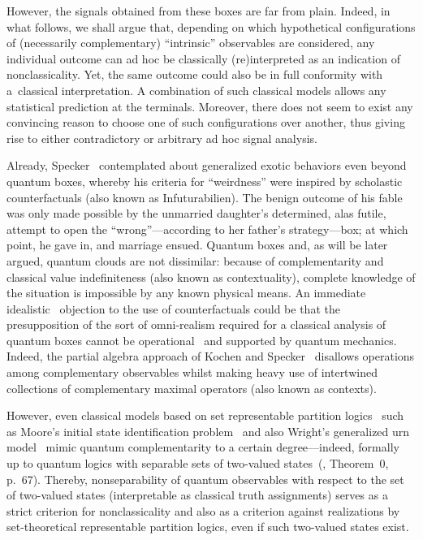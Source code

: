 However, the signals obtained from these boxes are far from plain.
Indeed, in what follows, we shall argue that,
depending on which hypothetical configurations of (necessarily complementary) ``intrinsic'' observables are
considered, any individual outcome can {ad hoc} be classically (re)interpreted as an indication of nonclassicality.
Yet, the same outcome could also be in full conformity with a~classical interpretation.
A combination of such classical models allows any statistical prediction at the terminals.
Moreover,
there does not seem to exist any convincing reason to choose one
of such configurations over another, thus giving rise to either contradictory or arbitrary {ad hoc} signal analysis.

Already, Specker~\cite{Specker-60} contemplated about generalized exotic behaviors even beyond quantum boxes,
whereby his criteria for ``weirdness'' were inspired by scholastic counterfactuals
(also known as {Infuturabilien}).
The benign outcome of his fable was only made possible by the unmarried daughter's determined, alas futile, attempt to open
the ``wrong''---according to her father's strategy---box; at which point, he gave in, and marriage ensued.
Quantum boxes and, as will be later argued, quantum clouds are not dissimilar: because
of complementarity
and classical value indefiniteness (also known as contextuality),
complete knowledge of the situation is impossible by any known physical means.
An immediate idealistic~\cite{berkeley,stace,Goldschmidt2017-idealism}
objection to the use of counterfactuals could
be that the presupposition of the sort of omni-realism required for a classical analysis of quantum boxes
cannot be operational~\cite{bridgman} and supported by quantum mechanics.
Indeed, the partial algebra approach of Kochen and Specker~\cite{Kochen2,Kochen3,Kochen1}
disallows operations among complementary observables
whilst making heavy use of intertwined collections of complementary maximal operators (also known as contexts).


However, even classical models based on set representable partition logics~\cite{svozil-2001-eua}
such as Moore's initial state identification problem~\cite{e-f-moore}
and also Wright's generalized urn model~\cite{wright:pent,wright}
mimic quantum complementarity to a certain degree---indeed,
formally up to quantum logics with separable sets of two-valued states~(\cite{Kochen1}, Theorem~0, p.~67).
Thereby, nonseparability of quantum observables with respect to the set
of two-valued states (interpretable as classical truth assignments)
serves as a strict criterion for nonclassicality
and also as a criterion against realizations by set-theoretical representable partition logics,
even if such two-valued states exist.



